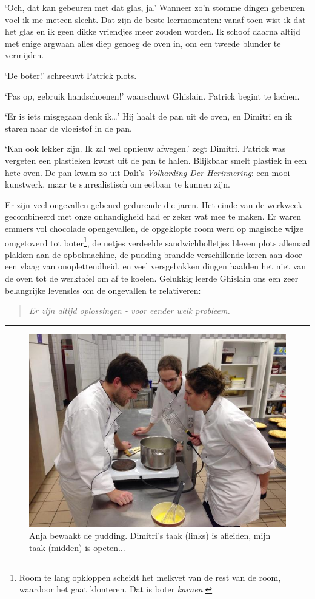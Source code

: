 \documentclass[
  11pt,
  dutch,
]{memoir}
\begin{document}
`Och, dat kan gebeuren met dat glas, ja.' Wanneer zo'n stomme dingen
gebeuren voel ik me meteen slecht. Dat zijn de beste leermomenten: vanaf
toen wist ik dat het glas en ik geen dikke vriendjes meer zouden worden.
Ik schoof daarna altijd met enige argwaan alles diep genoeg de oven in,
om een tweede blunder te vermijden.

`De boter!' schreeuwt Patrick plots.

`Pas op, gebruik handschoenen!' waarschuwt Ghislain. Patrick begint te
lachen.

`Er is iets misgegaan denk ik\ldots{}' Hij haalt de pan uit de oven, en
Dimitri en ik staren naar de vloeistof in de pan.

`Kan ook lekker zijn. Ik zal wel opnieuw afwegen.' zegt Dimitri. Patrick
was vergeten een plastieken kwast uit de pan te halen. Blijkbaar smelt
plastiek in een hete oven. De pan kwam zo uit Dali's \emph{Volharding
Der Herinnering}: een mooi kunstwerk, maar te surrealistisch om eetbaar
te kunnen zijn.

Er zijn veel ongevallen gebeurd gedurende die jaren. Het einde van de
werkweek gecombineerd met onze onhandigheid had er zeker wat mee te
maken. Er waren emmers vol chocolade opengevallen, de opgeklopte room
werd op magische wijze omgetoverd tot boter\footnote{Room te lang
  opkloppen scheidt het melkvet van de rest van de room, waardoor het
  gaat klonteren. Dat is boter \emph{karnen}.}, de netjes verdeelde
sandwichbolletjes bleven plots allemaal plakken aan de opbolmachine, de
pudding brandde verschillende keren aan door een vlaag van
onoplettendheid, en veel versgebakken dingen haalden het niet van de
oven tot de werktafel om af te koelen. Gelukkig leerde Ghislain ons een
zeer belangrijke levensles om de ongevallen te relativeren:

\begin{quote}
\emph{Er zijn altijd oplossingen - voor eender welk probleem.}
\end{quote}

\pfbreak

\begin{figure}
\centering
\includegraphics{img/bw/pudding.jpg}
\caption[Anja bewaakt de pudding tijdens de avondles.]{Anja bewaakt de pudding. Dimitri's taak (links) is afleiden, mijn taak (midden) is opeten...}
\end{figure}
\end{document}
